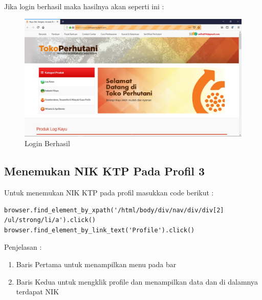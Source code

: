 Jika login berhasil maka hasilnya akan seperti ini :
\begin{figure}[h]
	\centering
	\includegraphics[scale=0.25]{figures/6LOGIN}
	\caption{Login Berhasil}
\end{figure}

\newpage
\subsection{Menemukan NIK KTP Pada Profil 3}
Untuk menemukan NIK KTP pada profil masukkan code berikut :
\begin{verbatim}
browser.find_element_by_xpath('/html/body/div/nav/div/div[2]
/ul/strong/li/a').click()
browser.find_element_by_link_text('Profile').click()
\end{verbatim}

Penjelasan :
\begin{enumerate}
	\item Baris Pertama untuk menampilkan menu pada bar
	\item Baris Kedua untuk mengklik profile dan menampilkan data dan di dalamnya terdapat NIK
\end{enumerate}

